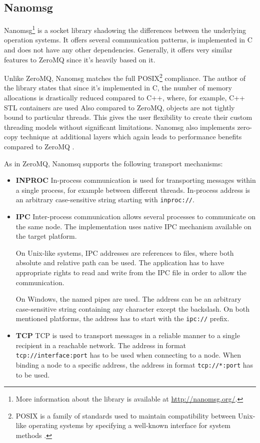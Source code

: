 \subsection{Nanomsg}
\label{nanomsg}
Nanomsg\footnote{More information about the library is available at \url{http://nanomsg.org/}.} is a socket library shadowing the differences between the underlying operation systems. It offers several communication patterns, is implemented in C and does not have any other dependencies. Generally, it offers very similar features to ZeroMQ since it's heavily based on it.

Unlike ZeroMQ, Nanomsg matches the full POSIX\footnote{POSIX is a family of standards used to maintain compatibility between Unix-like operating systems by specifying a well-known interface for system methods \cite{POSIX}. } compliance. The author of the library states that since it's implemented in C, the number of memory allocations is drastically reduced compared to C++, where, for example, C++ STL containers are used  Also compared to ZeroMQ, objects are not tightly bound to particular threads. This gives the user flexibility to create their custom threading models without significant limitations. Nanomsg also implements zero-copy technique at additional layers which again leads to performance benefits compared to ZeroMQ \cite{Nanomsg_Diff}.

As in ZeroMQ, Nanomsq supports the following transport mechanisms:
\begin{itemize}
	\item \textbf{INPROC} \newline
	In-process communication is used for transporting messages within a single process, for example between different threads. In-process address is an arbitrary case-sensitive string starting with \texttt{inproc://}.
	\item \textbf{IPC}  \newline 
	Inter-process communication allows several processes to communicate on the same node. The implementation uses native IPC mechanism available on the target platform. 
	
	On Unix-like systems, IPC addresses are references to files, where both absolute and relative path can be used. The application has to have appropriate rights to read and write from the IPC file in order to allow the communication.
	
	 On Windows, the named pipes are used. The address can be an arbitrary case-sensitive string containing any character except the backslash. On both mentioned platforms, the address has to start with the \texttt{ipc://} prefix.
	\item \textbf{TCP} \newline
	TCP is used to transport messages in a reliable manner to a single recipient in a reachable network. The address in format \texttt{tcp://interface:port} has to be used when connecting to a node. When binding a node to a specific address, the address in format \texttt{tcp://*:port} has to be used.
\end{itemize}

